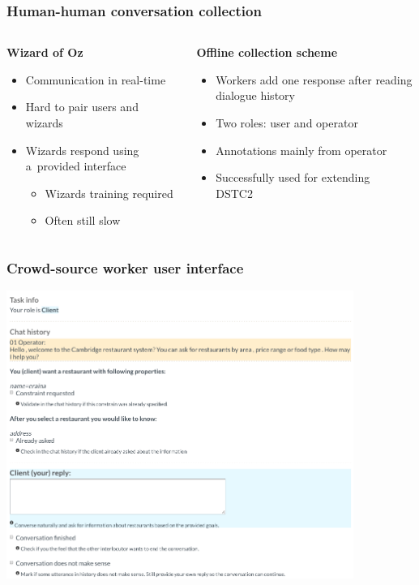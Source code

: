 \documentclass[10pt, compress,british,xcolor={svgnames,dvipsnames,x11names},trans]{beamer}
\begin{document}
\begin{frame}\frametitle{Human-human conversation collection}
\begin{columns}
\begin{column}{0.45\textwidth}
    {\bf Wizard of Oz} \\
    \begin{itemize}
        \item Communication in real-time 
        \item Hard to pair users and wizards
        \item Wizards respond using a~provided interface
            \begin{itemize}
                \item Wizards training required 
                \item Often still slow  
            \end{itemize}
    \end{itemize}
\end{column}
\begin{column}{0.45\textwidth}
    {\bf Offline collection scheme}
    \begin{itemize}
        \item Workers add one response after reading dialogue history  
        \item Two roles: user and operator 
        \item Annotations mainly from operator
        \item Successfully used for extending DSTC2~\cite{wen_networkbased_2016}
    \end{itemize}
\end{column}
\end{columns}
\end{frame}

\begin{frame}\frametitle{Crowd-source worker user interface}
    \begin{center}
    \includegraphics[width=0.85\textwidth]{./gui-annotators-client.png}
    \end{center}
\end{frame}
\end{document}
